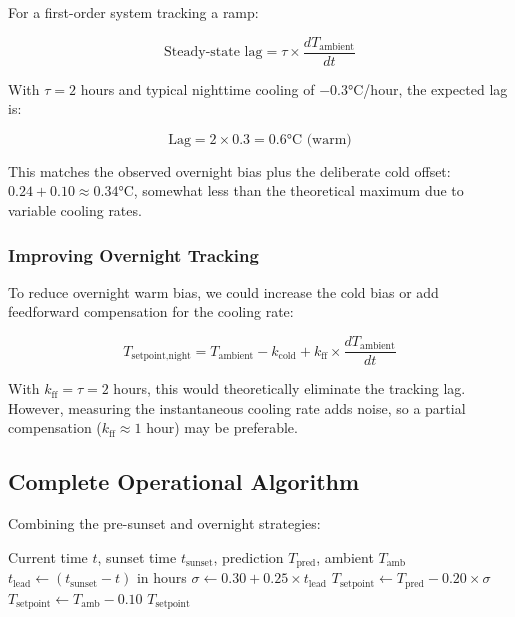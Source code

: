\documentclass[11pt,letterpaper]{article}
\begin{document}
For a first-order system tracking a ramp:

\begin{equation}
\text{Steady-state lag} = \tau \times \frac{dT_{\text{ambient}}}{dt}
\end{equation}

With $\tau = 2$ hours and typical nighttime cooling of $-0.3$°C/hour, the expected lag is:

\begin{equation}
\text{Lag} = 2 \times 0.3 = 0.6\text{°C (warm)}
\end{equation}

This matches the observed overnight bias plus the deliberate cold offset: $0.24 + 0.10 \approx 0.34$°C, somewhat less than the theoretical maximum due to variable cooling rates.

\subsubsection{Improving Overnight Tracking}

To reduce overnight warm bias, we could increase the cold bias or add feedforward compensation for the cooling rate:

\begin{equation}
T_{\text{setpoint,night}} = T_{\text{ambient}} - k_{\text{cold}} + k_{\text{ff}} \times \frac{dT_{\text{ambient}}}{dt}
\label{eq:overnight_ff}
\end{equation}

With $k_{\text{ff}} = \tau = 2$ hours, this would theoretically eliminate the tracking lag. However, measuring the instantaneous cooling rate adds noise, so a partial compensation ($k_{\text{ff}} \approx 1$ hour) may be preferable.

\subsection{Complete Operational Algorithm}

Combining the pre-sunset and overnight strategies:

\begin{algorithm}[H]
\caption{Complete Night Thermal Control}
\label{alg:fullnight}
\begin{algorithmic}[1]
\Require Current time $t$, sunset time $t_{\text{sunset}}$, prediction $T_{\text{pred}}$, ambient $T_{\text{amb}}$
 
    \State $t_{\text{lead}} \gets (t_{\text{sunset}} - t)$ in hours
    \State $\sigma \gets 0.30 + 0.25 \times t_{\text{lead}}$
    \State $T_{\text{setpoint}} \gets T_{\text{pred}} - 0.20 \times \sigma$
\Else {}
    \State $T_{\text{setpoint}} \gets T_{\text{amb}} - 0.10$
\EndIf
\State \Return $T_{\text{setpoint}}$
\end{algorithmic}
\end{algorithm}
\end{document}
